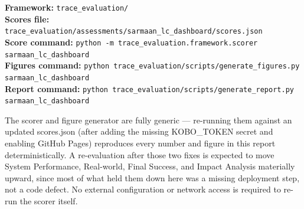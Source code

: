 \documentclass[12pt, a4paper]{article}
\begin{document}
\begin{mdframed}[style=mitigbox]
\textbf{Framework:} \texttt{trace\_evaluation/}\\
\textbf{Scores file:} \texttt{trace\_evaluation/assessments/sarmaan\_lc\_dashboard/scores.json}\\
\textbf{Score command:} \texttt{python -m trace\_evaluation.framework.scorer sarmaan\_lc\_dashboard}\\
\textbf{Figures command:} \texttt{python trace\_evaluation/scripts/generate\_figures.py sarmaan\_lc\_dashboard}\\
\textbf{Report command:} \texttt{python trace\_evaluation/scripts/generate\_report.py sarmaan\_lc\_dashboard}
\end{mdframed}

The scorer and figure generator are fully generic --- re-running them against an updated scores.json (after adding the missing KOBO\_TOKEN secret and enabling GitHub Pages) reproduces every number and figure in this report deterministically. A re-evaluation after those two fixes is expected to move System Performance, Real-world, Final Success, and Impact Analysis materially upward, since most of what held them down here was a missing deployment step, not a code defect. No external configuration or network access is required to re-run the scorer itself.
\end{document}
